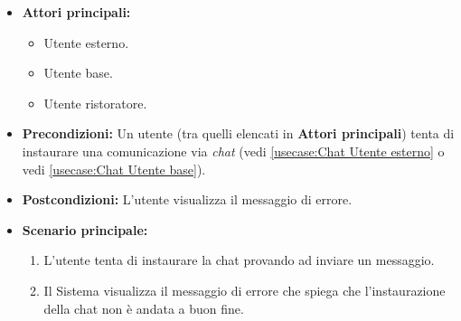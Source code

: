 \label{usecase:Errore instaurazione chat}
\begin{itemize}
    \item \textbf{Attori principali:} 
	\begin{itemize}
        \item Utente esterno.
        \item Utente base.
        \item Utente ristoratore.
    \end{itemize}

	\item \textbf{Precondizioni:}
	      Un utente (tra quelli elencati in \textbf{Attori principali}) tenta di instaurare una comunicazione via \textit{chat} (vedi \autoref{usecase:Chat Utente esterno} o vedi \autoref{usecase:Chat Utente base}).

	\item \textbf{Postcondizioni:}
	      L'utente visualizza il messaggio di errore.

	\item \textbf{Scenario principale:}
	      \begin{enumerate}
		      \item L'utente tenta di instaurare la chat provando ad inviare un messaggio.
		      \item Il Sistema visualizza il messaggio di errore che spiega che l'instaurazione della chat non è andata a buon fine.
	      \end{enumerate}
\end{itemize}